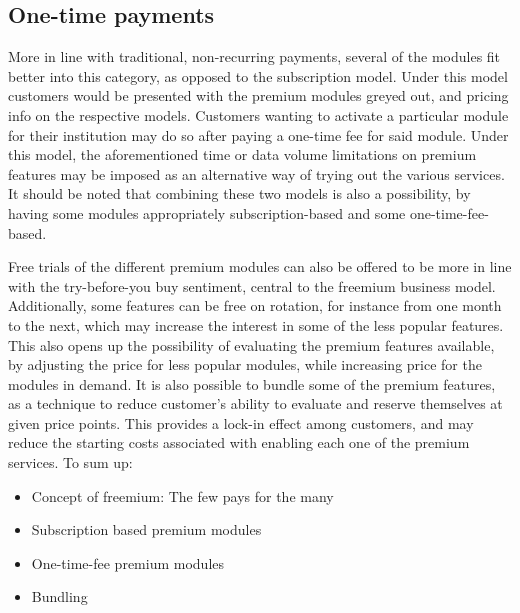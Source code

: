 \subsection{One-time payments}
More in line with traditional, non-recurring payments, several of the modules fit better into this category, as opposed to the subscription model. Under this model customers would be presented with the premium modules greyed out, and pricing info on the respective models. Customers wanting to activate a particular module for their institution may do so after paying a one-time fee for said module. Under this model, the aforementioned time or data volume limitations on premium features may be imposed as an alternative way of trying out the various services. It should be noted that combining these two models is also a possibility, by having some modules appropriately subscription-based and some one-time-fee-based.


Free trials of the different premium modules can also be offered to be more in line with the try-before-you buy sentiment, central to the freemium business model. Additionally, some features can be free on rotation, for instance from one month to the next, which may increase the interest in some of the less popular features. This also opens up the possibility of evaluating the premium features available, by adjusting the price for less popular modules, while increasing price for the modules in demand. It is also possible to bundle some of the premium features, as a technique to reduce customer's ability to evaluate and reserve themselves at given price points. This provides a lock-in effect among customers, and may reduce the starting costs associated with enabling each one of the premium services. To sum up:

\begin{itemize}
    \item Concept of freemium: The few pays for the many
    \item Subscription based premium modules
    \item One-time-fee premium modules
    \item Bundling
\end{itemize}

